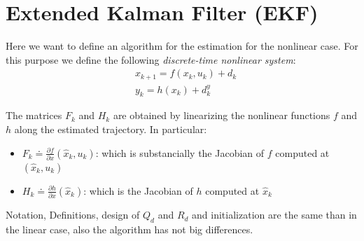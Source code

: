 \section{Extended Kalman Filter (EKF)}
Here we want to define an algorithm for the estimation for the nonlinear case. For this purpose we define the following \textit{discrete-time nonlinear system}:
\begin{align*}
    &x_{k+1} = f(x_k, u_k) + d_k\\
    &y_k = h(x_k) + d_k^y
\end{align*} 

The matrices $F_k$ and $H_k$ are obtained by linearizing the nonlinear functions $f$ and $h$ along the estimated trajectory. In particular:
\begin{itemize}
    \item $F_k \doteq \frac{\partial f}{\partial x} (\hat{x}_k, u_k)$: which is substancially the Jacobian of $f$ computed at $(\hat{x}_k, u_k)$
    \item $H_k \doteq \frac{\partial h}{\partial x}(\hat{x}_k)$: which is the Jacobian of $h$ computed at $\hat{x}_k$
\end{itemize}
Notation, Definitions, design of $Q_d$ and $R_d$ and initialization are the same than in the linear case, also the algorithm has not big differences.\\

\hspace*{-5mm}
%

